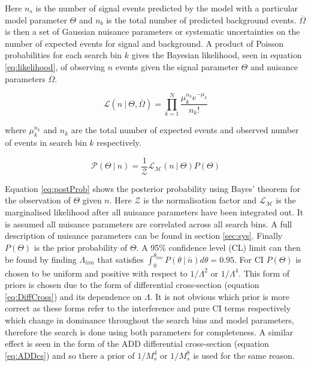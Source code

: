    Here $n_{s}$ is the number of signal events predicted by the model with a particular model parameter $\Theta$ and $n_{b}$ is the total number of predicted background events. $\overline{\Omega}$ is then a set of Gaussian nuisance parameters or systematic uncertainties on the number of expected events for signal and background. A product of Poisson probabilities for each search bin $k$ gives the Bayesian likelihood, seen in equation \ref{eq:likelihood}, of observing $n$ events given the signal parameter $\Theta$ and nuisance parameters $\overline{\Omega}$.

	\begin{equation}
		\mathcal{L}(n~|~\Theta,\overline{\Omega}) = \prod\limits^{N}_{k=1}{\frac{\mu^{n_{k}}_{k} e^{-\mu_{k}}}{n_{k}!}}
    	\label{eq:likelihood}
    \end{equation}

    where $\mu^{n_{k}}_{k}$ and $n_{k}$ are the total number of expected events and observed number of events in search bin $k$ respectively. 


	\begin{equation}
		\mathcal{P}(\Theta~|~n) = \frac{1}{\mathcal{Z}}\mathcal{L}_{\mathcal{M}}(n~|~\Theta)P(\Theta)
    	\label{eq:postProb}
    \end{equation}

    Equation \ref{eq:postProb} shows the posterior probability using Bayes' theorem for the observation of $\Theta$ given $n$. Here $\mathcal{Z}$ is the normalisation factor and $\mathcal{L}_{\mathcal{M}}$ is the marginalised likelihood after all nuisance parameters have been integrated out. It is assumed all nuisance parameters are correlated across all search bins. A full description of nuisance parameters can be found in section \ref{sec:sys}. Finally $P(\Theta)$ is the prior probability of $\Theta$. A 95\% confidence level (CL) limit can then be found by finding $\Lambda_{lim}$ that satisfies $\int_{0} ^{\theta_{lim}} P(\theta~|~\bar{n}) d\theta = 0.95$. For CI $P(\Theta)$ is chosen to be uniform and positive with respect to $1/\Lambda^{2}$ or $1/\Lambda^{4}$. This form of priors is chosen due to the form of differential cross-section (equation \ref{eq:DiffCross}) and its dependence on $\Lambda$. It is not obvious which prior is more correct as these forms refer to the interference and pure CI terms respectively which change in dominance throughout the search bins and model parameters, therefore the search is done using both parameters for completeness. A similar effect is seen in the form of the ADD differential cross-section (equation \ref{eq:ADDcs}) and so there a prior of $1/M_{s}^{4}$ or $1/M_{s}^{8}$ is used for the same reason. 

